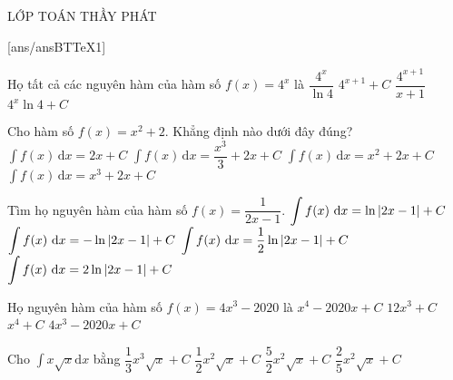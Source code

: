 \begin{name}
{\tenchude}{\tendethi}{LỚP TOÁN THẦY PHÁT}{\thoigian}
\end{name}
[ans/ansBTTeX1]
\begin{ex}%
Họ tất cả các nguyên hàm của hàm số  $ f(x)=4^x $ là
\choice
{\True $ \dfrac{4^x}{\ln 4} $}
{$ 4^{x+1}+C $}
{$ \dfrac{4^{x+1}}{x+1} $}
{$ 4^x\ln 4+C $}
\end{ex}

\begin{ex}%
Cho hàm số $ f(x)=x^2+2$. Khẳng định nào dưới đây đúng?
\choice
{$\displaystyle\int{f(x)\,\mathrm{d}x=2x+C}$}
{\True $\displaystyle\int{f( x )\,\mathrm{d}x=\dfrac{x^3}{3}+2x+C}$}
{$\displaystyle\int{f( x )\,\mathrm{d}x=x^2+2x+C}$}
{$\displaystyle\int{f( x )\,\mathrm{d}x=x^3+2x+C}$}
\end{ex}

\begin{ex}%
Tìm họ nguyên hàm của hàm số $f(x)=\dfrac{1}{2x-1}$.
\choice
{$\displaystyle\int f(x){~\rm d}x=\ln \left|2x-1\right|+C$}
{\True $\displaystyle\int f(x){~\rm d}x=-\ln \left|2x-1\right|+C$}
{$\displaystyle\int f(x){~\rm d}x=\dfrac{1}{2}\ln \left|2x-1\right|+C$}
{$\displaystyle\int f(x){~\rm d}x=2\ln \left|2x-1\right|+C$}
\end{ex}

\begin{ex}%
Họ nguyên hàm của hàm số $f(x)=4x^3-2020$ là
\choice
{\True $x^4-2020x+C$}
{$12x^3+C$}
{$x^4+C$}
{$4x^3-2020x+C$}
\end{ex}

\begin{ex}%
Cho $\int x\sqrt{x} \mathrm{d}x$ bằng
\choice
{$\dfrac{1}{3}x^3 \sqrt{x}+C$}
{$\dfrac{1}{2}x^2\sqrt{x}+C$}
{$\dfrac{5}{2}x^2\sqrt{x}+C$}
{\True $\dfrac{2}{5}x^2\sqrt{x}+C$}
\end{ex}

